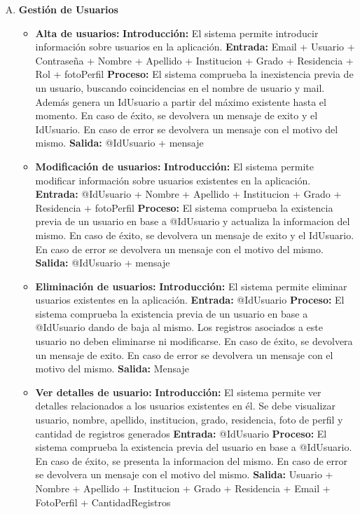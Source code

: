     \begin{enumerate}[A.]
      \item \textbf{Gestión de Usuarios}
        \begin{itemize}  
          \item \textbf{Alta de usuarios:}
            \tab \textbf{Introducción:} El sistema permite introducir información sobre usuarios en la aplicación.
            \tab \textbf{Entrada:} Email + Usuario + Contraseña + Nombre + Apellido + Institucion + Grado + Residencia + Rol + fotoPerfil
            \tab \textbf{Proceso:} El sistema comprueba la inexistencia previa de un usuario, buscando coincidencias en el nombre de usuario y mail. Además genera un IdUsuario a partir del máximo existente hasta el momento. En caso de éxito, se devolvera un mensaje de exito y el IdUsuario. En caso de error se devolvera un mensaje con el motivo del mismo.
            \tab \textbf{Salida:} @IdUsuario + mensaje

          \item \textbf{Modificación de usuarios:}
            \tab \textbf{Introducción:} El sistema permite modificar información sobre usuarios existentes en la aplicación.
            \tab \textbf{Entrada:} @IdUsuario + Nombre + Apellido + Institucion + Grado + Residencia + fotoPerfil
            \tab \textbf{Proceso:} El sistema comprueba la existencia previa de un usuario en base a @IdUsuario y actualiza la informacion del mismo. En caso de éxito, se devolvera un mensaje de exito y el IdUsuario. En caso de error se devolvera un mensaje con el motivo del mismo.
            \tab \textbf{Salida:} @IdUsuario + mensaje

          \item \textbf{Eliminación de usuarios:}
            \tab \textbf{Introducción:} El sistema permite eliminar usuarios existentes en la aplicación.
            \tab \textbf{Entrada:} @IdUsuario
            \tab \textbf{Proceso:} El sistema comprueba la existencia previa de un usuario en base a @IdUsuario dando de baja al mismo. Los registros asociados a este usuario no deben eliminarse ni modificarse. En caso de éxito, se devolvera un mensaje de exito. En caso de error se devolvera un mensaje con el motivo del mismo.
            \tab \textbf{Salida:} Mensaje

          \item \textbf{Ver detalles de usuario:}
            \tab \textbf{Introducción:} El sistema permite ver detalles relacionados a los usuarios existentes en él. Se debe visualizar usuario, nombre, apellido, institucion, grado, residencia, foto de perfil y cantidad de registros generados
            \tab \textbf{Entrada:} @IdUsuario
            \tab \textbf{Proceso:} El sistema comprueba la existencia previa del usuario en base a @IdUsuario. En caso de éxito, se presenta la informacion del mismo. En caso de error se devolvera un mensaje con el motivo del mismo.
            \tab \textbf{Salida:} Usuario + Nombre + Apellido + Institucion + Grado + Residencia + Email + FotoPerfil + CantidadRegistros


\end{itemize}
\end{enumerate}
